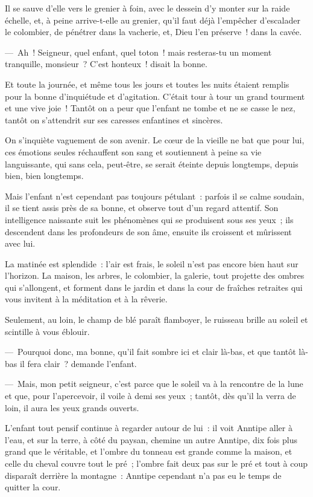 \documentclass[french,twoside]{book} %
\begin{document}
Il se sauve d’elle vers le grenier à foin, avec le dessein d’y monter sur la raide échelle, et, à peine arrive-t-elle au grenier, qu’il faut déjà l’empêcher d’escalader le colombier, de pénétrer dans la vacherie, et, Dieu l’en préserve ! dans la cavée.\par
— Ah ! Seigneur, quel enfant, quel toton ! mais resteras-tu un moment tranquille, monsieur ? C’est honteux ! disait la bonne.\par
Et toute la journée, et même tous les jours et toutes les nuits étaient remplis pour la bonne d’inquiétude et d’agitation. C’était tour à tour un grand tourment et une vive joie ! Tantôt on a peur que l’enfant ne tombe et ne se casse le nez, tantôt on s’attendrit sur ses caresses enfantines et sincères.\par
On s’inquiète vaguement de son avenir. Le cœur de la vieille ne bat que pour lui, ces émotions seules réchauffent son sang et soutiennent à peine sa vie languissante, qui sans cela, peut-être, se serait éteinte depuis longtemps, depuis bien, bien longtemps.\par
Mais l’enfant n’est cependant pas toujours pétulant : parfois il se calme soudain, il se tient assis près de sa bonne, et observe tout d’un regard attentif. Son intelligence naissante suit les phénomènes qui se produisent sous ses yeux ; ils descendent dans les profondeurs de son âme, ensuite ils croissent et mûrissent avec lui.\par
La matinée est splendide : l’air est frais, le soleil n’est pas encore bien haut sur l’horizon. La maison, les arbres, le colombier, la galerie, tout projette des ombres qui s’allongent, et forment dans le jardin et dans la cour de fraîches retraites qui vous invitent à la méditation et à la rêverie.\par
Seulement, au loin, le champ de blé paraît flamboyer, le ruisseau brille au soleil et scintille à vous éblouir.\par
— Pourquoi donc, ma bonne, qu’il fait sombre ici et clair là-bas, et que tantôt là-bas il fera clair ? demande l’enfant.\par
— Mais, mon petit seigneur, c’est parce que le soleil va à la rencontre de la lune et que, pour l’apercevoir, il voile à demi ses yeux ; tantôt, dès qu’il la verra de loin, il aura les yeux grands ouverts.\par
L’enfant tout pensif continue à regarder autour de lui : il voit Anntipe aller à l’eau, et sur la terre, à côté du paysan, chemine un autre Anntipe, dix fois plus grand que le véritable, et l’ombre du tonneau est grande comme la maison, et celle du cheval couvre tout le pré ; l’ombre fait deux pas sur le pré et tout à coup disparaît derrière la montagne : Anntipe cependant n’a pas eu le temps de quitter la cour.\par
\end{document}
